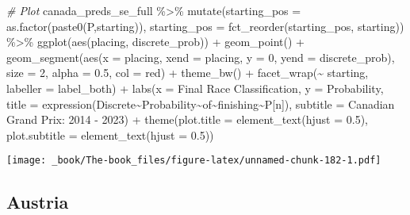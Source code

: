 \documentclass[
]{book}
\newenvironment{Shaded}{\begin{snugshade}}{\end{snugshade}}
\newcommand{\AttributeTok}[1]{\textcolor[rgb]{0.77,0.63,0.00}{#1}}
\newcommand{\CommentTok}[1]{\textcolor[rgb]{0.56,0.35,0.01}{\textit{#1}}}
\newcommand{\DecValTok}[1]{\textcolor[rgb]{0.00,0.00,0.81}{#1}}
\newcommand{\FloatTok}[1]{\textcolor[rgb]{0.00,0.00,0.81}{#1}}
\newcommand{\FunctionTok}[1]{\textcolor[rgb]{0.00,0.00,0.00}{#1}}
\newcommand{\NormalTok}[1]{#1}
\newcommand{\SpecialCharTok}[1]{\textcolor[rgb]{0.00,0.00,0.00}{#1}}
\newcommand{\StringTok}[1]{\textcolor[rgb]{0.31,0.60,0.02}{#1}}
\begin{document}
\begin{Shaded}
\begin{Highlighting}[]
\CommentTok{\# Plot}
\NormalTok{canada\_preds\_se\_full }\SpecialCharTok{\%\textgreater{}\%}
  \FunctionTok{mutate}\NormalTok{(}\AttributeTok{starting\_pos =} \FunctionTok{as.factor}\NormalTok{(}\FunctionTok{paste0}\NormalTok{(}\StringTok{\textquotesingle{}P\textquotesingle{}}\NormalTok{,starting)),}
         \AttributeTok{starting\_pos =} \FunctionTok{fct\_reorder}\NormalTok{(starting\_pos, starting)) }\SpecialCharTok{\%\textgreater{}\%}
  \FunctionTok{ggplot}\NormalTok{(}\FunctionTok{aes}\NormalTok{(placing, discrete\_prob)) }\SpecialCharTok{+}
  \FunctionTok{geom\_point}\NormalTok{() }\SpecialCharTok{+}
  \FunctionTok{geom\_segment}\NormalTok{(}\FunctionTok{aes}\NormalTok{(}\AttributeTok{x =}\NormalTok{ placing, }\AttributeTok{xend =}\NormalTok{ placing, }\AttributeTok{y =} \DecValTok{0}\NormalTok{, }\AttributeTok{yend =}\NormalTok{ discrete\_prob),}
               \AttributeTok{size =} \DecValTok{2}\NormalTok{, }\AttributeTok{alpha =} \FloatTok{0.5}\NormalTok{, }\AttributeTok{col =} \StringTok{\textquotesingle{}red\textquotesingle{}}\NormalTok{) }\SpecialCharTok{+}
  \FunctionTok{theme\_bw}\NormalTok{() }\SpecialCharTok{+}
  \FunctionTok{facet\_wrap}\NormalTok{(}\SpecialCharTok{\textasciitilde{}}\NormalTok{ starting, }\AttributeTok{labeller =}\NormalTok{ label\_both) }\SpecialCharTok{+}
  \FunctionTok{labs}\NormalTok{(}\AttributeTok{x =} \StringTok{\textquotesingle{}Final Race Classification\textquotesingle{}}\NormalTok{,}
       \AttributeTok{y =} \StringTok{\textquotesingle{}Probability\textquotesingle{}}\NormalTok{,}
       \AttributeTok{title =} \FunctionTok{expression}\NormalTok{(Discrete}\SpecialCharTok{\textasciitilde{}}\NormalTok{Probability}\SpecialCharTok{\textasciitilde{}}\NormalTok{of}\SpecialCharTok{\textasciitilde{}}\NormalTok{finishing}\SpecialCharTok{\textasciitilde{}}\NormalTok{P[n]),}
       \AttributeTok{subtitle =} \StringTok{\textquotesingle{}Canadian Grand Prix: 2014 {-} 2023\textquotesingle{}}\NormalTok{) }\SpecialCharTok{+}
  \FunctionTok{theme}\NormalTok{(}\AttributeTok{plot.title =} \FunctionTok{element\_text}\NormalTok{(}\AttributeTok{hjust =} \FloatTok{0.5}\NormalTok{),}
        \AttributeTok{plot.subtitle =} \FunctionTok{element\_text}\NormalTok{(}\AttributeTok{hjust =} \FloatTok{0.5}\NormalTok{)) }
\end{Highlighting}
\end{Shaded}

\texttt{[image: \_book/The-book\_files/figure-latex/unnamed-chunk-182-1.pdf]}

\hypertarget{austria}{%
\subsection{Austria}\label{austria}}
\end{document}
